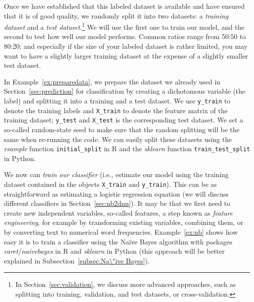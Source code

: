 Once we have established that this labeled dataset is available and
have ensured that it is of good quality, we randomly split it into two
datasets: a \emph{training dataset} and a \emph{test
  dataset}.\footnote{In Section~\ref{sec:validation}, we discuss more
  advanced approaches, such as splitting into training, validation,
  and test datasets, or cross-validation.}  We will use the first one
to train our model, and the second to test how well our model
performs. Common ratios range from 50:50 to 80:20; and especially if
the size of your labeled dataset is rather limited, you may want to
have a slightly larger training dataset at the expense of a slightly
smaller test dataset.

In Example~\ref{ex:preparedata}, we prepare the dataset we already used in
Section~\ref{sec:prediction} for classification by creating a
dichotomous variable (the label) and splitting it into a training and
a test dataset. We use \verb|y_train| to denote the training labels and
\verb|X_train| to denote the feature matrix of the training dataset;
\verb|y_test| and \verb|X_test| is the corresponding test dataset. We set a
so-called random-state seed to make sure that the random splitting
will be the same when re-running the code. We can easily split these datasets using the \emph{rsample} function \texttt{initial\_split} in R and the \emph{sklearn} function \texttt{train\_test\_split} in Python.


We now can \emph{train our classifier} (i.e., estimate our model using the
training dataset contained in the objects \texttt{X\_train} and \texttt{y\_train}). This can be as straightforward as estimating a
logistic regression equation (we will discuss different classifiers in
Section~\ref{sec:nb2dnn}).  It may be that we first need to create new
independent variables, so-called features, a step known as
\emph{feature engineering}, for example by transforming existing
variables, combining them, or by converting text to numerical word
frequencies.
Example~\ref{ex:nb} shows how easy it is to train a classifier using the Na\"ive Bayes algorithm with packages \emph{caret}/\emph{naivebayes} in R and \emph{sklearn} in Python (this approach will be better explained in Subsection~\ref{subsec:Na\"ive Bayes}).


